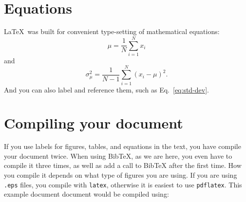 \documentclass[preprint]{aastex61}
\begin{document}
\section{Equations}

\LaTeX\  was built for convenient type-setting of mathematical equations:
\begin{equation}
\mu = \frac{1}{N} \sum_{i = 1}^N x_i
\end{equation}
and
\begin{equation}
\sigma_\mu^2 = \frac{1}{N-1} \sum_{i = 1}^N (x_i - \mu)^2.
\label{eq:std-dev}
\end{equation}
And you can also label and reference them, such as Eq.~\ref{eq:std-dev}.

\section{Compiling your document}

If you use labels for figures, tables, and equations in the text, you have compile your document twice.  When using BibTeX, as we are here, you even have to compile it three times, as well as add a call to BibTeX after the first time.  How you compile it depends on what type of figures you are using.  If you are using {\tt .eps} files, you compile with {\tt latex}, otherwise it is easiest to use {\tt pdflatex}.  This example document document would be compiled using:



\end{document}
